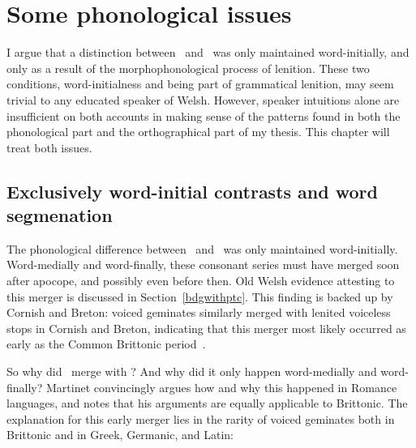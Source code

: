 \chapter{Some phonological issues}
\label{cha:some-phon-issu}
I argue that a distinction between \lT\ and \xD\ was only maintained word-initially, and only as a result of the morphophonological process of lenition. These two conditions, word-initialness and being part of grammatical lenition, may seem trivial to any educated speaker of Welsh. However, speaker intuitions alone are insufficient on both accounts in making sense of the patterns found in both the phonological part and the orthographical part of my thesis. This chapter will treat both issues.

\section{Exclusively word-initial contrasts and word segmenation}
\label{sec:excl-word-init}
The phonological difference between \lT\ and \xD\ was only maintained word-initially. Word-medially and word-finally, these consonant series must have merged soon after apocope, and possibly even before then. Old Welsh evidence attesting to this merger is discussed in Section~\ref{bdgwithptc}. This finding is backed up by Cornish and Breton: voiced geminates similarly merged with lenited voiceless stops in Cornish and Breton, indicating that this merger most likely occurred as early as the Common Brittonic period~\textcite[31]{schrijver_old_2011}.


So why did \lT\ merge with \xD? And why did it only happen word-medially and word-finally? Martinet convincingly argues how and why this happened in Romance languages, and notes that his arguments are equally applicable to Brittonic. The explanation for this early merger lies in the rarity of voiced geminates both in Brittonic and in Greek, Germanic, and Latin: 

